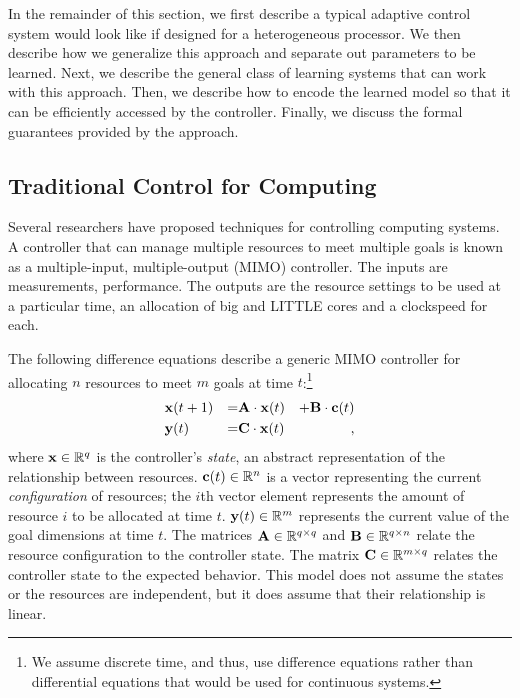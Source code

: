 In the remainder of this section, we first describe a typical adaptive
control system would look like if designed for a heterogeneous
processor.  We then describe how we generalize this approach and
separate out parameters to be learned.  Next, we describe the general
class of learning systems that can work with this approach.  Then, we
describe how to encode the learned model so that it can be efficiently
accessed by the controller.  Finally, we discuss the formal guarantees
provided by the \SYSTEM{} approach.


\subsection{Traditional Control for Computing}
Several researchers have proposed techniques for controlling computing
systems.  A controller that can manage multiple resources to meet
multiple goals is known as a multiple-input, multiple-output (MIMO)
controller.  The inputs are measurements, \eg{} performance.  The
outputs are the resource settings to be used at a particular time,
\eg{} an allocation of big and LITTLE cores and a clockspeed for each.

The following difference equations describe a generic MIMO controller
for allocating $n$ resources to meet $m$ goals at time
$t$:\footnote{We assume discrete time, and thus, use difference
  equations rather than differential equations that would be used for
  continuous systems.}
\begin{equation}
\begin{aligned}
&\mathbf{x}(t+1) &=& \mathbf{A} \cdot \mathbf{x}(t)& + \mathbf{B} \cdot \mathbf{c}(t)\\
&\mathbf{y}(t)   &=& \mathbf{C} \cdot \mathbf{x}(t)&,
\end{aligned}
\label{eqn:system:mimo}
\end{equation}
where $\mathbf{x} \in \mathbb{R}^{q}$ is the controller's \emph{state}, an abstract
representation of the relationship between resources.  $\mathbf{c}(t)
\in \mathbb{R}^n$ is a vector representing the current \emph{configuration} of
resources; \ie{} the $i$th vector element represents the amount of
resource $i$ to be allocated at time $t$.  $\mathbf{y}(t) \in \mathbb{R}^{m}$
represents the current value of the goal dimensions at time $t$. The
matrices $\mathbf{A} \in \mathbb{R}^{q \times q}$ and $\mathbf{B} \in \mathbb{R}^{q
\times n}$ relate the resource configuration to the controller state.
The matrix $\mathbf{C} \in \mathbb{R}^{m \times q}$ relates the controller state to the expected
behavior.  This model does not assume the states or the resources are
independent, but it does assume that their relationship is linear.  

